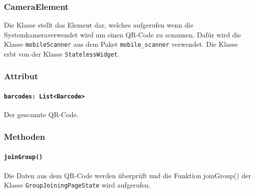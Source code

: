 \documentclass[parskip=full]{scrartcl}
\begin{document}
    \subsubsection*{CameraElement}
    Die Klasse stellt das Element dar, welches aufgerufen wenn die Systemkameraverwendet wird um einen QR-Code zu scnannen. Dafür wird die Klasse \texttt{mobileScanner} aus dem Paket \texttt{mobile\_scanner} verwendet. Die Klasse erbt von der Klasse \texttt{StatelessWidget}.
        \subsubsection*{Attribut}
            \paragraph*{\texttt{barcodes: List<Barcode>}}  Der gescannte QR-Code.

        \subsubsection*{Methoden}
            \paragraph*{\texttt{joinGroup()}} Die Daten aus dem QR-Code werden überprüft und die Funktion joinGroup() der Klasse \texttt{GroupJoiningPageState} wird aufgerufen.
    
\end{document}
